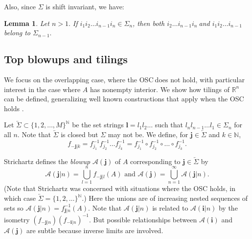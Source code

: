 \documentclass{amsproc}%
\theoremstyle{plain}
\newtheorem{lemma}{Lemma}
\theoremstyle{definition}
\numberwithin{equation}{section}
\begin{document}
Also, since $\Sigma$ is shift invariant, we have:

\begin{lemma}
\label{smallerlemma}Let $n>1.$ If $i_{1}i_{2}\dots i_{n-1}i_{n}\in\Sigma_{n}$,
then both $i_{2}\dots i_{n-1}i_{n}\ $and $i_{1}i_{2}\dots i_{n-1}\ $belong to
$\Sigma_{n-1}.$
\end{lemma}

\subsection{Top blowups and tilings\label{topblowupsec}}

We focus on the overlapping case, where the OSC$\ $does not hold, with
particular interest in the case where $A$ has nonempty interior. We show how
tilings of $\mathbb{R}^{n}$ can be defined, generalizing well known
constructions that apply when the OSC holds \cite{bandt2, tilings, strichartz}.

Let $\overleftarrow{\Sigma}\subset\{1,2,\dots,M\}^{\mathbb{N}}$ be the set
strings $\mathbf{l}=l_{1}l_{2}\dots$ such that $l_{n}l_{n-1}\dots l_{1}%
\in\Sigma_{n}$ for all $n.$ Note that $\overleftarrow{\Sigma}$ is closed but
$\Sigma$ may not be. We define, for $\mathbf{j\in}\overleftarrow{\Sigma}$ and
$k\in\mathbb{N}$,
\[
f_{-\mathbf{j}|k}=f_{j_{1}}^{-1}f_{j_{2}}^{-1}\dots f_{j_{k}}^{-1}=f_{j_{1}%
}^{-1}\circ f_{j_{2}}^{-1}\circ\dots\circ f_{j_{k}}^{-1}.
\]


Strichartz \cite{strichartz} defines the \textit{blowup} $\mathcal{A}\left(
\mathbf{j}\right)  $ of $A$ corresponding to $\mathbf{j\in}%
\overleftarrow{\Sigma}$ by%
\[
\mathcal{A}\left(  \mathbf{j|}n\right)  =\bigcup\limits_{l=1}^{n}%
f_{-\mathbf{j}|l}\left(  A\right)  \text{ and }\mathcal{A}\left(
\mathbf{j}\right)  =\bigcup\limits_{n=1}^{\infty}\mathcal{A}\left(
\mathbf{j|}n\right)  .
\]
(Note that Strichartz was concerned with situations where the OSC holds, in
which case $\overleftarrow{\Sigma}=\{1,2,\dots\}^{\mathbb{N}}.$) Here the
unions are of increasing nested sequences of sets so $\mathcal{A}\left(
\mathbf{j|}n\right)  =f_{\mathbf{j}|n}^{-1}\left(  A\right)  .$ Note that
$\mathcal{A}\left(  \mathbf{j|}n\right)  $ is related to $\mathcal{A}\left(
\mathbf{i|}n\right)  $ by the isometry $\left(  f_{-\mathbf{j}|n}\right)
\left(  f_{-\mathbf{i}|n}\right)  ^{-1}$. But possible relationships between
$\mathcal{A}\left(  \mathbf{i}\right)  $ and $\mathcal{A}\left(
\mathbf{j}\right)  $ are subtle because inverse limits are involved.
\end{document}
